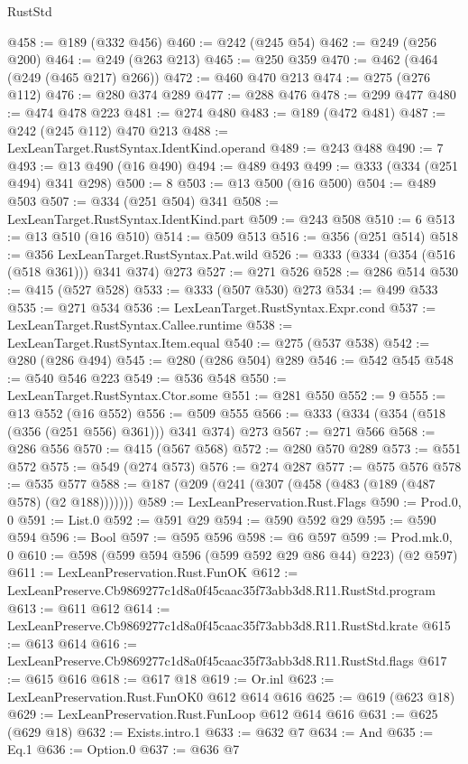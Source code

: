 \begin{lexlean}{RustStd}
\begin{coremodule}
@458 := @189 (@332 @456)
@460 := @242 (@245 @54)
@462 := @249 (@256 @200)
@464 := @249 (@263 @213)
@465 := @250 @359
@470 := @462 (@464 (@249 (@465 @217) @266))
@472 := @460 @470 @213
@474 := @275 (@276 @112)
@476 := @280 @374 @289
@477 := @288 @476
@478 := @299 @477
@480 := @474 @478 @223
@481 := @274 @480
@483 := @189 (@472 @481)
@487 := @242 (@245 @112) @470 @213
@488 := LexLeanTarget.RustSyntax.IdentKind.operand
@489 := @243 @488
@490 := 7
@493 := @13 @490 (@16 @490)
@494 := @489 @493
@499 := @333 (@334 (@251 @494) @341 @298)
@500 := 8
@503 := @13 @500 (@16 @500)
@504 := @489 @503
@507 := @334 (@251 @504) @341
@508 := LexLeanTarget.RustSyntax.IdentKind.part
@509 := @243 @508
@510 := 6
@513 := @13 @510 (@16 @510)
@514 := @509 @513
@516 := @356 (@251 @514)
@518 := @356 LexLeanTarget.RustSyntax.Pat.wild
@526 := @333 (@334 (@354 (@516 (@518 @361))) @341 @374) @273
@527 := @271 @526
@528 := @286 @514
@530 := @415 (@527 @528)
@533 := @333 (@507 @530) @273
@534 := @499 @533
@535 := @271 @534
@536 := LexLeanTarget.RustSyntax.Expr.cond
@537 := LexLeanTarget.RustSyntax.Callee.runtime
@538 := LexLeanTarget.RustSyntax.Item.equal
@540 := @275 (@537 @538)
@542 := @280 (@286 @494)
@545 := @280 (@286 @504) @289
@546 := @542 @545
@548 := @540 @546 @223
@549 := @536 @548
@550 := LexLeanTarget.RustSyntax.Ctor.some
@551 := @281 @550
@552 := 9
@555 := @13 @552 (@16 @552)
@556 := @509 @555
@566 := @333 (@334 (@354 (@518 (@356 (@251 @556) @361))) @341 @374) @273
@567 := @271 @566
@568 := @286 @556
@570 := @415 (@567 @568)
@572 := @280 @570 @289
@573 := @551 @572
@575 := @549 (@274 @573)
@576 := @274 @287
@577 := @575 @576
@578 := @535 @577
@588 := @187 (@209 (@241 (@307 (@458 (@483 (@189 (@487 @578) (@2 @188)))))))
@589 := LexLeanPreservation.Rust.Flags
@590 := Prod.{0, 0}
@591 := List.{0}
@592 := @591 @29
@594 := @590 @592 @29
@595 := @590 @594
@596 := Bool
@597 := @595 @596
@598 := @6 @597
@599 := Prod.mk.{0, 0}
@610 := @598 (@599 @594 @596 (@599 @592 @29 @86 @44) @223) (@2 @597)
@611 := LexLeanPreservation.Rust.FunOK
@612 := LexLeanPreserve.Cb9869277c1d8a0f45caac35f73abb3d8.R11.RustStd.program
@613 := @611 @612
@614 := LexLeanPreserve.Cb9869277c1d8a0f45caac35f73abb3d8.R11.RustStd.krate
@615 := @613 @614
@616 := LexLeanPreserve.Cb9869277c1d8a0f45caac35f73abb3d8.R11.RustStd.flags
@617 := @615 @616
@618 := @617 @18
@619 := Or.inl
@623 := LexLeanPreservation.Rust.FunOK0 @612 @614 @616
@625 := @619 (@623 @18)
@629 := LexLeanPreservation.Rust.FunLoop @612 @614 @616
@631 := @625 (@629 @18)
@632 := Exists.intro.{1}
@633 := @632 @7
@634 := And
@635 := Eq.{1}
@636 := Option.{0}
@637 := @636 @7

\end{coremodule}
\end{lexlean}
